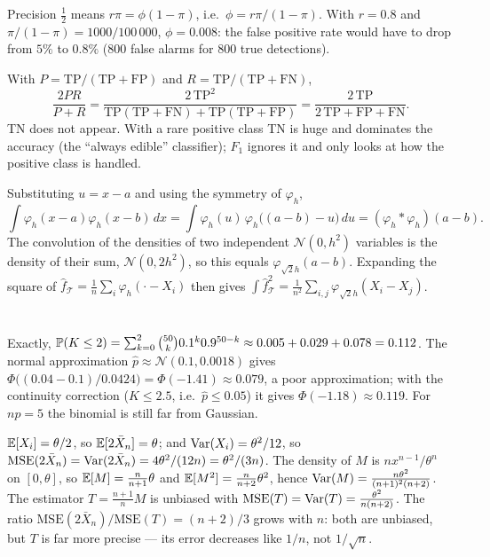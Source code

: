 Precision $\frac12$ means $r\pi = \phi(1-\pi)$, i.e.\ $\phi = r\pi/(1-\pi)$. With
$r = 0.8$ and $\pi/(1-\pi) = 1000/100\,000$, $\phi = 0.008$: the false positive
rate would have to drop from $5\%$ to $0.8\%$ ($800$ false alarms for $800$ true
detections).

With $P = \mathrm{TP}/(\mathrm{TP}+\mathrm{FP})$ and $R = \mathrm{TP}/(\mathrm{TP}+\mathrm{FN})$,
\[
  \frac{2PR}{P+R} = \frac{2\,\mathrm{TP}^2}{\mathrm{TP}(\mathrm{TP}+\mathrm{FN}) + \mathrm{TP}(\mathrm{TP}+\mathrm{FP})}
  = \frac{2\,\mathrm{TP}}{2\,\mathrm{TP}+\mathrm{FP}+\mathrm{FN}} .
\]
TN does not appear. With a rare positive class TN is huge and dominates the
accuracy (the ``always edible'' classifier); $F_1$ ignores it and only looks at
how the positive class is handled.

Substituting $u = x - a$ and using the symmetry of $\varphi_h$,
\[
  \int\varphi_h(x-a)\varphi_h(x-b)\,dx = \int\varphi_h(u)\,\varphi_h\bigl((a-b) - u\bigr)\,du = (\varphi_h * \varphi_h)(a-b).
\]
The convolution of the densities of two independent $\mathcal N(0,h^2)$
variables is the density of their sum, $\mathcal N(0,2h^2)$, so this equals
$\varphi_{\sqrt2h}(a-b)$. Expanding the square of
$\hat f_{\mathcal T} = \frac1n\sum_i\varphi_h(\cdot - X_i)$ then gives
$\int\hat f_{\mathcal T}^2 = \frac1{n^2}\sum_{i,j}\varphi_{\sqrt2h}(X_i - X_j)$.

\section{}

Exactly, $\mathbb{P}(K\leq2) = \sum_{k=0}^2\binom{50}k0.1^k0.9^{50-k}\approx0.005 + 0.029 + 0.078 = 0.112$.
The normal approximation $\hat p\approx\mathcal N(0.1, 0.0018)$ gives
$\Phi\bigl((0.04-0.1)/0.0424\bigr) = \Phi(-1.41)\approx0.079$, a poor approximation;
with the continuity correction ($K\leq2.5$, i.e.\ $\hat p\leq0.05$) it gives
$\Phi(-1.18)\approx0.119$. For $np = 5$ the binomial is still far from Gaussian.

$\mathbb{E}[X_i] = \theta/2$, so $\mathbb{E}[2\bar X_n] = \theta$; and $\operatorname{Var}(X_i) = \theta^2/12$, so
$\mathrm{MSE}(2\bar X_n) = \operatorname{Var}(2\bar X_n) = 4\theta^2/(12n) = \theta^2/(3n)$. The density of
$M$ is $nx^{n-1}/\theta^n$ on $[0,\theta]$, so $\mathbb{E}[M] = \frac n{n+1}\theta$ and
$\mathbb{E}[M^2] = \frac n{n+2}\theta^2$, hence $\operatorname{Var}(M) = \frac{n\theta^2}{(n+1)^2(n+2)}$. The
estimator $T = \frac{n+1}nM$ is unbiased with $\mathrm{MSE}(T) = \operatorname{Var}(T) = \frac{\theta^2}{n(n+2)}$.
The ratio $\mathrm{MSE}(2\bar X_n)/\mathrm{MSE}(T) = (n+2)/3$ grows with $n$: both are
unbiased, but $T$ is far more precise --- its error decreases like $1/n$, not
$1/\sqrt n$.

